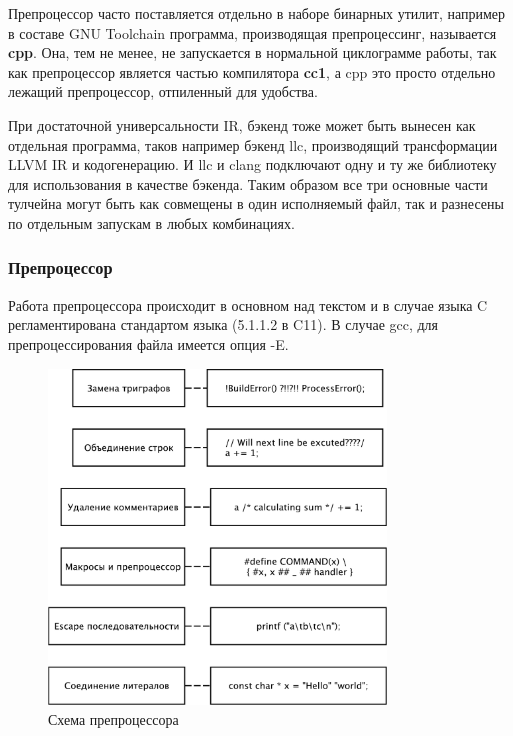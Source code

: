 \documentclass[a4paper,12pt,oneside]{article}
\begin{document}
Препроцессор часто поставляется отдельно в наборе бинарных утилит, например в составе GNU Toolchain программа, производящая препроцессинг, называется \textbf{cpp}. Она, тем не менее, не запускается в нормальной циклограмме работы, так как препроцессор является частью компилятора \textbf{cc1}, а cpp это просто отдельно лежащий препроцессор, отпиленный для удобства.

При достаточной универсальности IR, бэкенд тоже может быть вынесен как отдельная программа, таков например бэкенд llc, производящий трансформации LLVM IR и кодогенерацию. И llc и clang подключают одну и ту же библиотеку для использования в качестве бэкенда. Таким образом все три основные части тулчейна могут быть как совмещены в один исполняемый файл, так и разнесены по отдельным запускам в любых комбинациях.

\subsubsection{Препроцессор}\label{subsec:Preprocessor}

Работа препроцессора происходит в основном над текстом и в случае языка C регламентирована стандартом языка (5.1.1.2 в C11). В случае gcc, для препроцессирования файла имеется опция -E.

\begin{figure}[ht]
\centering
\includegraphics[width=0.8\textwidth]{illustrations/preprocessor-scheme-crop.pdf}
\caption{Схема препроцессора}
\label{fig:preproc_scheme}
\end{figure}
\end{document}

